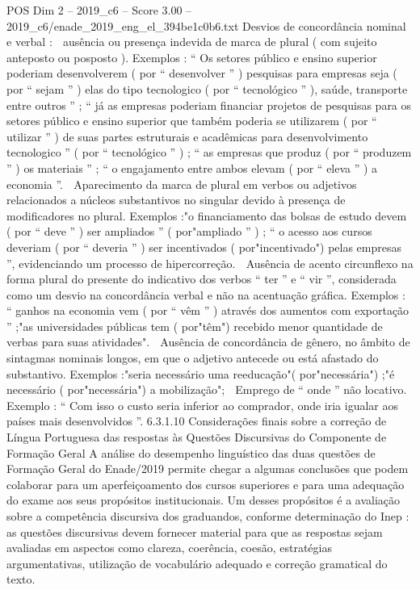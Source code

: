 \begin{textsample}{POS Dim 2 – 2019\_c6 – Score 3.00 – 2019\_c6/enade\_2019\_eng\_el\_394be1c0b6.txt}
Desvios de concordância nominal e verbal :  ausência ou presença indevida de marca de plural ( com sujeito anteposto ou posposto ).
Exemplos : “ Os setores público e ensino superior poderiam desenvolverem ( por “ desenvolver ” ) pesquisas para empresas seja ( por “ sejam ” ) elas do tipo tecnologico ( por “ tecnológico ” ), saúde, transporte entre outros ” ; “ já as empresas poderiam financiar projetos de pesquisas para os setores público e ensino superior que também poderia se utilizarem ( por “ utilizar ” ) de suas partes estruturais e acadêmicas para desenvolvimento tecnologico ” ( por “ tecnológico ” ) ; “ as empresas que produz ( por “ produzem ” ) os materiais ” ; “ o engajamento entre ambos elevam ( por “ eleva ” ) a economia ”.  Aparecimento da marca de plural em verbos ou adjetivos relacionados a núcleos substantivos no singular devido à presença de modificadores no plural.
Exemplos :"o financiamento das bolsas de estudo devem ( por “ deve ” ) ser ampliados ” ( por"ampliado ” ) ; “ o acesso aos cursos deveriam ( por “ deveria ” ) ser incentivados ( por"incentivado") pelas empresas ”, evidenciando um processo de hipercorreção.  Ausência de acento circunflexo na forma plural do presente do indicativo dos verbos “ ter ” e “ vir ”, considerada como um desvio na concordância verbal e não na acentuação gráfica.
Exemplos : “ ganhos na economia vem ( por “ vêm ” ) através dos aumentos com exportação ” ;"as universidades públicas tem ( por"têm") recebido menor quantidade de verbas para suas atividades".  Ausência de concordância de gênero, no âmbito de sintagmas nominais longos, em que o adjetivo antecede ou está afastado do substantivo.
Exemplos :"seria necessário uma reeducação"( por"necessária") ;"é necessário ( por"necessária") a mobilização";  Emprego de “ onde ” não locativo.
Exemplo : “ Com isso o custo seria inferior ao comprador, onde iria igualar aos países mais desenvolvidos ”. 6.3.1.10 Considerações finais sobre a correção de Língua Portuguesa das respostas às Questões Discursivas do Componente de Formação Geral A análise do desempenho linguístico das duas questões de Formação Geral do Enade/2019 permite chegar a algumas conclusões que podem colaborar para um aperfeiçoamento dos cursos superiores e para uma adequação do exame aos seus propósitos institucionais.
Um desses propósitos é a avaliação sobre a competência discursiva dos graduandos, conforme determinação do Inep : as questões discursivas devem fornecer material para que as respostas sejam avaliadas em aspectos como clareza, coerência, coesão, estratégias argumentativas, utilização de vocabulário adequado e correção gramatical do texto.

\end{textsample}
